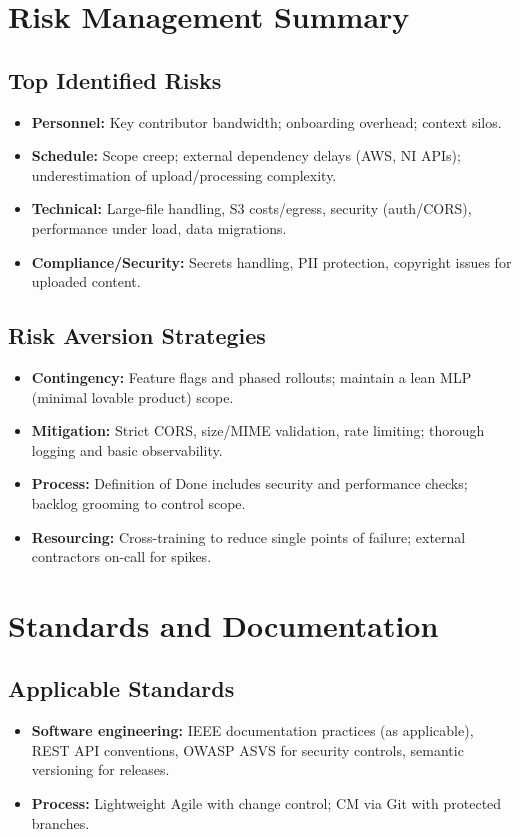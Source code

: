 \documentclass[12pt,a4paper]{article}
\begin{document}
\section{Risk Management Summary}

\subsection{Top Identified Risks}
\begin{itemize}
\item \textbf{Personnel:} Key contributor bandwidth; onboarding overhead; context silos.
\item \textbf{Schedule:} Scope creep; external dependency delays (AWS, NI APIs); underestimation of upload/processing complexity.
\item \textbf{Technical:} Large-file handling, S3 costs/egress, security (auth/CORS), performance under load, data migrations.
\item \textbf{Compliance/Security:} Secrets handling, PII protection, copyright issues for uploaded content.
\end{itemize}

\subsection{Risk Aversion Strategies}
\begin{itemize}
\item \textbf{Contingency:} Feature flags and phased rollouts; maintain a lean MLP (minimal lovable product) scope.
\item \textbf{Mitigation:} Strict CORS, size/MIME validation, rate limiting; thorough logging and basic observability.
\item \textbf{Process:} Definition of Done includes security and performance checks; backlog grooming to control scope.
\item \textbf{Resourcing:} Cross-training to reduce single points of failure; external contractors on-call for spikes.
\end{itemize}

\section{Standards and Documentation}

\subsection{Applicable Standards}
\begin{itemize}
\item \textbf{Software engineering:} IEEE documentation practices (as applicable), REST API conventions, OWASP ASVS for security controls, semantic versioning for releases.
\item \textbf{Process:} Lightweight Agile with change control; CM via Git with protected branches.
\end{itemize}
\end{document}
